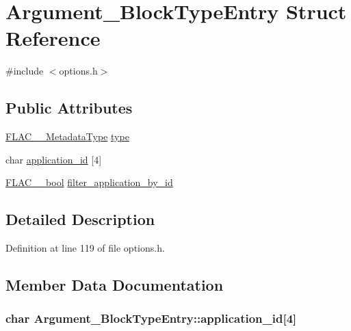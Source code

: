 \hypertarget{struct_argument___block_type_entry}{}\section{Argument\+\_\+\+Block\+Type\+Entry Struct Reference}
\label{struct_argument___block_type_entry}


{\ttfamily \#include $<$options.\+h$>$}

\subsection*{Public Attributes}
\begin{DoxyCompactItemize}
\item 
\hyperlink{group__flac__format_gac71714ba8ddbbd66d26bb78a427fac01}{F\+L\+A\+C\+\_\+\+\_\+\+Metadata\+Type} \hyperlink{struct_argument___block_type_entry_ad3ff44029f5edfa7acc20616b7e1a9a0}{type}
\item 
char \hyperlink{struct_argument___block_type_entry_a4c743dfc269bbc5bfbcf6d5bf1efd907}{application\+\_\+id} \mbox{[}4\mbox{]}
\item 
\hyperlink{ordinals_8h_a95103469f1cbd78b8cf250194985b34e}{F\+L\+A\+C\+\_\+\+\_\+bool} \hyperlink{struct_argument___block_type_entry_a2f5545e19f56a9e4418a88ad112044fd}{filter\+\_\+application\+\_\+by\+\_\+id}
\end{DoxyCompactItemize}


\subsection{Detailed Description}


Definition at line 119 of file options.\+h.



\subsection{Member Data Documentation}
\subsubsection[{\texorpdfstring{application\+\_\+id}{application_id}}]{\setlength{\rightskip}{0pt plus 5cm}char Argument\+\_\+\+Block\+Type\+Entry\+::application\+\_\+id\mbox{[}4\mbox{]}}\hypertarget{struct_argument___block_type_entry_a4c743dfc269bbc5bfbcf6d5bf1efd907}{}\label{struct_argument___block_type_entry_a4c743dfc269bbc5bfbcf6d5bf1efd907}


